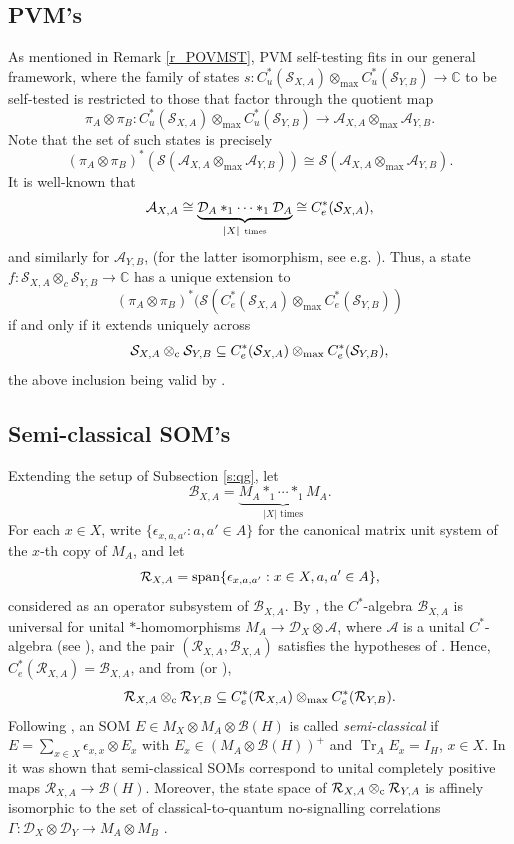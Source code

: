 \documentclass[11pt]{amsart}
\theoremstyle{definition}
\DeclareMathOperator{\tr}{Tr}
\newcommand{\cl}[1]{\mathcal{#1}}
\newcommand{\ten}{\otimes}
\newcommand{\C}{\mathbb{C}}
\begin{document}
\subsection{PVM's}

As mentioned in Remark \ref{r_POVMST}, PVM self-testing fits in our general framework, where the family of states $s : C^*_u(\cl S_{X,A})\otimes_{\max} C^*_u(\cl S_{Y,B})\to \C$ to be self-tested is restricted to 
those that factor through the quotient map
$$\pi_A\ten\pi_B:C^*_u(\cl S_{X,A})\otimes_{\max} C^*_u(\cl S_{Y,B})\to 
\cl A_{X,A}\otimes_{\max} \cl A_{Y,B}.$$
Note that the set of such states is precisely
$$(\pi_A\ten\pi_B)^*(\cl{S}(\cl A_{X,A}\otimes_{\max} \cl A_{Y,B}))\cong \cl{S}(\cl A_{X,A}\otimes_{\max} \cl A_{Y,B}).$$
It is well-known that
$$\cl A_{X,A}\cong \underbrace{\cl D_{A}\ast_1\cdots\ast_1 \cl D_{A}}_{|X| \mbox{ \tiny times}}\cong C^*_e(\cl S_{X,A}),$$
and similarly for $\cl A_{Y,B}$,  (for the latter isomorphism, see e.g. \cite[Corollary 2.9]{bks}). Thus, a state $f:\cl{S}_{X,A}\ten_c\cl{S}_{Y,B}\to\C$ has a unique extension to $$(\pi_A\ten\pi_B)^*(\cl{S}(C^*_e(\cl{S}_{X,A})\otimes_{\max} C^*_e(\cl{S}_{Y,B}))$$
if and only if it extends uniquely across
$$\cl{S}_{X,A}\ten_{\rm c}\cl{S}_{Y,B}\subseteq C^*_e(\cl{S}_{X,A})\otimes_{\max} C^*_e(\cl{S}_{Y,B}),$$
the above inclusion being valid by \cite[Lemma 3.10]{bks}.





\subsection{Semi-classical SOM's}
Extending the setup of Subsection \ref{s:qg}, let 
$$\cl B_{X,A} = \underbrace{M_A\ast_1\cdots\ast_1 M_A}_{|X| \mbox{ times}}.$$
For each $x\in X$, write $\{\epsilon_{x,a,a'} : a,a'\in A\}$ 
for the canonical matrix unit system of the $x$-th copy of $M_A$, and let
$$\cl R_{X,A} = {\rm span}\{\epsilon_{x,a,a'} : x\in X, a,a'\in A\},$$
considered as an operator subsystem of $\cl B_{X,A}$. By \cite[Corollary 2.9]{bks}, the $C^*$-algebra $\cl B_{X,A}$ is universal for unital $*$-homomorphisms $M_A\to \cl D_{X}\ten\cl A$, where $\cl A$ is a unital $C^*$-algebra (see \cite[Definition 2.2]{bks}), and the pair $(\cl R_{X,A},\cl B_{X,A})$ satisfies the hypotheses of \cite[Theorem 3.8]{bks}. Hence, $C^*_e(\cl R_{X,A})=\cl B_{X,A}$, and from \cite[Lemma 3.10]{bks} (or \cite[Lemma 2.8]{pt}),
$$\cl R_{X,A}\ten_{\rm c} \cl R_{Y,B}\subseteq C^*_e(\cl R_{X,A})\ten_{\rm max}C^*_e(\cl R_{Y,B}).$$
Following \cite[\S7.1]{tt-QNS}, an SOM $E\in M_X\ten M_A\ten \cl{B}(H)$ is called \textit{semi-classical} if $E=\sum_{x\in X}\epsilon_{x,x}\ten E_x$ with $E_x\in (M_A\ten\cl{B}(H))^+$ and $\tr_A E_x=I_H$, $x\in X$.
In \cite[Theorem 7.5]{tt-QNS} it was shown that semi-classical SOMs correspond to unital completely positive maps $\cl{R}_{X,A}\to\cl B(H)$. Moreover, the state space of $\cl{R}_{X,A}\ten_{\rm c}\cl{R}_{Y,A}$ is affinely isomorphic to the set of classical-to-quantum no-signalling correlations $\Gamma:\cl D_X\ten \cl D_Y\to M_A\ten M_B$ \cite[Theorem 7.7]{tt-QNS}. 
\end{document}
